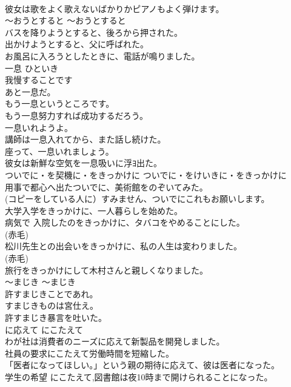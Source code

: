 \documentclass[8pt]{extreport}
\begin{document}
\begin{CJK}{UTF8}{min}
\\	彼女は歌をよく歌えないばかりかピアノもよく弾けます。  
\\	〜おうとすると	〜おうとすると	
\\	バスを降りようとすると、後ろから押された。   
\\	出かけようとすると、父に呼ばれた。  
\\	お風呂に入ろうとしたときに、電話が鳴りました。  
\\	一息	ひといき	
\\	我慢することです	
\\	あと一息だ。   
\\	もう一息というところです。   
\\	もう一息努力すれば成功するだろう。 
\\	一息いれようよ。 
\\	講師は一息入れてから、また話し続けた。 
\\	座って、一息いれましょう。 
\\	彼女は新鮮な空気を一息吸いに浮ﾖ出た。 
\\	ついでに・を契機に・をきっかけに	ついでに・をけいきに・をきっかけに	
\\	用事で都心へ出たついでに、美術館をのぞいてみた。  
\\	(コピーをしている人に）すみません、ついでにこれもお願いします。  
\\	大学入学をきっかけに、一人暮らしを始めた。  
\\	病気で 入院したのをきっかけに、タバコをやめることにした。  
\\	(赤毛)
\\	松川先生との出会いをきっかけに、私の人生は変わりました。  
\\	(赤毛)
\\	旅行をきっかけにして木村さんと親しくなりました。  
\\	〜まじき	〜まじき	
\\	許すまじきことであれ。  
\\	すまじきものは宮仕え。  
\\	許すまじき暴言を吐いた。  
\\	に応えて	にこたえて	
\\	わが社は消費者のニーズに応えて新製品を開発しました。  
\\	社員の要求にこたえて労働時間を短縮した。  
\\	「医者になってほしい。」という親の期待に応えて、彼は医者になった。   
\\	学生の希望 にこたえて,図書館は夜10時まで開けられることになった。  

\end{CJK}
\end{document}
